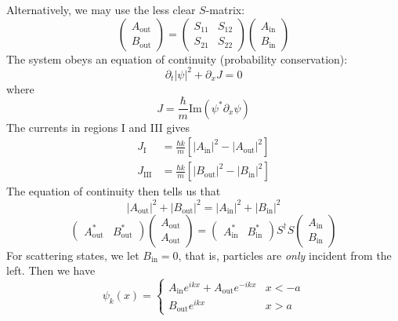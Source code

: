 \documentclass{article}
\begin{document}
Alternatively, we may use the less clear $S$-matrix:
			$$\left(\begin{array}{c}A_{\mathrm{out}} \\B_{\mathrm{out}}\end{array}\right)=\left(\begin{array}{cc}S_{11} & S_{12} \\S_{21} & S_{22}\end{array}\right)\left(\begin{array}{c}A_{\mathrm{in}} \\B_{\mathrm{in}}\end{array}\right)$$
			The system obeys an equation of continuity (probability conservation):
			$$\partial_t\left|\psi\right|^2+\partial_xJ=0$$
			where
			$$J=\frac{\hbar}{m}\mathrm{Im}\left(\psi^*\partial_x\psi\right)$$
			The currents in regions I and III gives
			\begin{align*}
				J_{\mathrm{I}}&=\frac{\hbar k}{m}\left[\left|A_{\mathrm{in}}\right|^2-\left|A_{\mathrm{out}}\right|^2\right]\\
				J_{\mathrm{III}}&=\frac{\hbar k}{m}\left[\left|B_{\mathrm{out}}\right|^2-\left|B_{\mathrm{in}}\right|^2\right]
			\end{align*}
			The equation of continuity then tells us that
			$$\left|A_{\mathrm{out}}\right|^2+\left|B_{\mathrm{out}}\right|^2=\left|A_{\mathrm{in}}\right|^2+\left|B_{\mathrm{in}}\right|^2$$
			$$\left(\begin{array}{cc}A_{\mathrm{out}}^* & B_{\mathrm{out}}^*\end{array}\right)\left(\begin{array}{c}A_{\mathrm{out}} \\A_{\mathrm{out}}\end{array}\right)=\left(\begin{array}{cc}A_{\mathrm{in}}^* & B_{\mathrm{in}}^*\end{array}\right)S^\dagger S\left(\begin{array}{c}A_{\mathrm{in}} \\B_{\mathrm{in}}\end{array}\right)$$
			For scattering states, we let $B_{\mathrm{in}}=0$, that is, particles are \emph{only} incident from the left. Then we have
			$$\psi_k(x)=\begin{cases} A_{\mathrm{in}}e^{ikx}+A_{\mathrm{out}}e^{-ikx} & x<-a\\
			B_{\mathrm{out}}e^{ikx} &x>a \end{cases}$$
\end{document}
